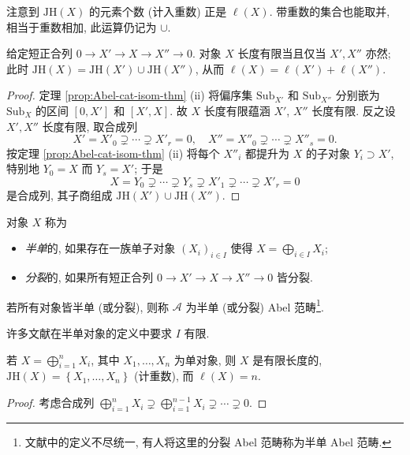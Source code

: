 注意到 $\mathrm{JH}(X)$ 的元素个数 (计入重数) 正是 $\ell(X)$. 带重数的集合也能取并, 相当于重数相加, 此运算仍记为 $\cup$.

\begin{lemma}
	给定短正合列 $0 \to X' \to X \to X'' \to 0$. 对象 $X$ 长度有限当且仅当 $X', X''$ 亦然; 此时 $\mathrm{JH}(X) = \mathrm{JH}(X') \cup \mathrm{JH}(X'')$, 从而 $\ell(X) = \ell(X') + \ell(X'')$.
\end{lemma}
\begin{proof}
	定理 \ref{prop:Abel-cat-isom-thm} (ii) 将偏序集 $\mathrm{Sub}_{X'}$ 和 $\mathrm{Sub}_{X''}$ 分别嵌为 $\mathrm{Sub}_X$ 的区间 $[0, X']$ 和 $[X', X]$. 故 $X$ 长度有限蕴涵 $X'$, $X''$ 长度有限. 反之设 $X', X''$ 长度有限, 取合成列
	\[ X' = X'_0 \supsetneq \cdots \supsetneq X'_r = 0, \quad X'' = X''_0 \supsetneq \cdots \supsetneq X''_s = 0. \]
	按定理 \ref{prop:Abel-cat-isom-thm} (ii) 将每个 $X''_i$ 都提升为 $X$ 的子对象 $Y_i \supset X'$, 特别地 $Y_0 = X$ 而 $Y_s = X'$; 于是
	\[ X = Y_0 \supsetneq \cdots \supsetneq Y_s \supsetneq X'_1 \supsetneq \cdots \supsetneq X'_r = 0 \]
	是合成列, 其子商组成 $\mathrm{JH}(X') \cup \mathrm{JH}(X'')$.
\end{proof}

\begin{definition}\label{def:semisimple}
	对象 $X$ 称为
	\begin{itemize}
		\item \emph{半单}的, 如果存在一族单子对象 $(X_i)_{i \in I}$ 使得 $X = \bigoplus_{i \in I} X_i$;
		\item \emph{分裂}的, 如果所有短正合列 $0 \to X' \to X \to X'' \to 0$ 皆分裂.
	\end{itemize}
	若所有对象皆半单 (或分裂), 则称 $\mathcal{A}$ 为半单 (或分裂) Abel 范畴\footnote{文献中的定义不尽统一, 有人将这里的分裂 Abel 范畴称为半单 Abel 范畴.}.
\end{definition}

许多文献在半单对象的定义中要求 $I$ 有限.

\begin{lemma}
	若 $X = \bigoplus_{i=1}^n X_i$, 其中 $X_1, \ldots, X_n$ 为单对象, 则 $X$ 是有限长度的, $\mathrm{JH}(X) = \left\{ X_1, \ldots, X_n \right\}$ (计重数), 而 $\ell(X) = n$.
\end{lemma}
\begin{proof}
	考虑合成列 $\bigoplus_{i=1}^n X_i \supsetneq \bigoplus_{i=1}^{n-1} X_i \supsetneq \cdots \supsetneq 0$.
\end{proof}

